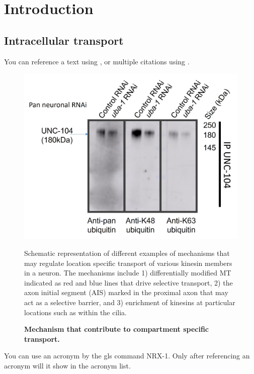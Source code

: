 
\chapter{Introduction}

\section{Intracellular transport}
 You can reference a text using \parencite{fu2013}, or multiple citations using \parencite{klopfenstein2004, kumar2019, mahajan2019}.
 
 
\begin{figure}[H]
	\centering
	\includegraphics[width=\textwidth]{figs/example}
	
	\caption[Mechanism that contribute to compartment specific transport.]{\textbf{Mechanism that contribute to compartment specific transport.}} \raggedright \small Schematic representation of different examples of mechanisms that may regulate location specific transport of various kinesin members in a neuron. The mechanisms include 1) differentially modified MT indicated as red and blue lines that drive selective transport, 2) the axon initial segment (AIS) marked in the proximal axon that may act as a selective barrier, and 3) enrichment of kinesins at particular locations such as within the cilia.
 	\label{fig:Ch1f1}
\end{figure}

You can use an acronym by the gls command \gls{NRX-1}. Only after referencing an acronym will it show in the acronym list.

